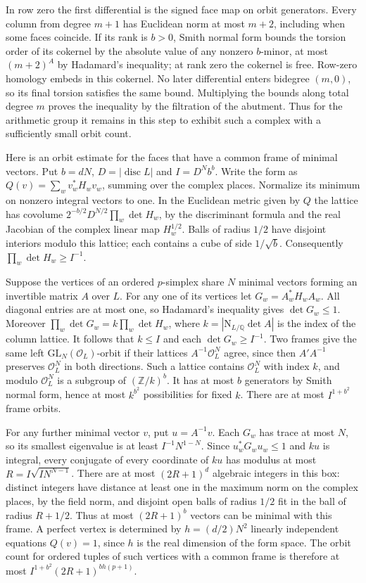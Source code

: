 \documentclass[11pt]{amsart}
\theoremstyle{definition}
\theoremstyle{remark}
\begin{document}
In row zero the first differential is the signed face map on orbit
generators. Every column from degree $m+1$ has Euclidean norm at most
$m+2$, including when some faces coincide. If its rank is $b>0$,
Smith normal form bounds the torsion order of its cokernel by the
absolute value of any nonzero $b$-minor, at most $(m+2)^A$ by
Hadamard's inequality; at rank zero the cokernel is free.
Row-zero homology embeds in this cokernel. No later differential
enters bidegree $(m,0)$, so its final torsion satisfies the same
bound. Multiplying the bounds along total degree $m$ proves the
inequality by the filtration of the abutment. Thus for the arithmetic
group it remains in this step to exhibit such a complex with a
sufficiently small orbit count.

Here is an orbit estimate for the faces that have a common frame
of minimal vectors. Put $b=dN$, $D=|\operatorname{disc}L|$ and
$I=D^N b^b$. Write the form as $Q(v)=\sum_w v_w^*H_wv_w$, summing
over the complex places. Normalize its minimum on nonzero integral
vectors to one. In the Euclidean metric given by $Q$ the lattice has
covolume $2^{-b/2}D^{N/2}\prod_w\det H_w$, by the discriminant formula
and the real Jacobian of the complex linear map $H_w^{1/2}$.
Balls of radius $1/2$ have disjoint interiors modulo this lattice;
each contains a cube of side $1/\sqrt b$. Consequently
$\prod_w\det H_w\ge I^{-1}$.

Suppose the vertices of an ordered $p$-simplex share $N$ minimal
vectors forming an invertible matrix $A$ over $L$. For any one of its
vertices let $G_w=A_w^*H_w A_w$. All diagonal entries are at most one,
so Hadamard's inequality gives $\det G_w\le1$. Moreover
$\prod_w\det G_w=k\prod_w\det H_w$, where
$k=|\mathrm N_{L/\mathbb Q}\det A|$ is the index of the column lattice.
It follows that $k\le I$ and each $\det G_w\ge I^{-1}$.
Two frames give the same left $\mathrm{GL}_N(\mathcal O_L)$-orbit
if their lattices $A^{-1}\mathcal O_L^N$ agree, since then
$A'A^{-1}$ preserves $\mathcal O_L^N$ in both directions.
Such a lattice contains $\mathcal O_L^N$ with index $k$, and modulo
$\mathcal O_L^N$ is a subgroup of $(\mathbb Z/k)^b$. It has at most
$b$ generators by Smith normal form, hence at most $k^{b^2}$
possibilities for fixed $k$. There are at most $I^{1+b^2}$ frame orbits.

For any further minimal vector $v$, put $u=A^{-1}v$. Each $G_w$
has trace at most $N$, so its smallest eigenvalue is at least
$I^{-1}N^{1-N}$. Since $u_w^*G_w u_w\le1$ and $ku$ is integral,
every conjugate of every coordinate of $ku$ has modulus at most
$R=I\sqrt{IN^{N-1}}$. There are at most $(2R+1)^d$ algebraic integers
in this box: distinct integers have distance at least one in the
maximum norm on the complex places, by the field norm, and disjoint
open balls of radius $1/2$ fit in the ball of radius $R+1/2$.
Thus at most $(2R+1)^b$ vectors can be minimal with this frame.
A perfect vertex is determined by $h=(d/2)N^2$ linearly independent
equations $Q(v)=1$, since $h$ is the real dimension of the form
space. The orbit count for ordered tuples of such vertices with a common
frame is therefore at most $I^{1+b^2}(2R+1)^{bh(p+1)}$.
\end{document}
